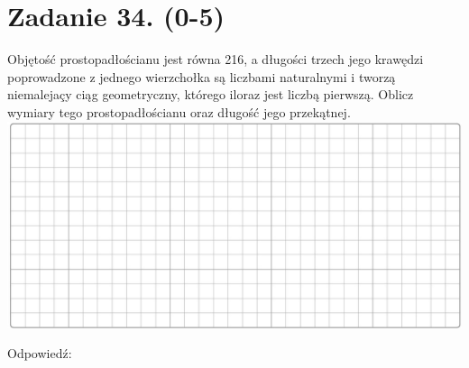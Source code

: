 \documentclass[10pt]{article}
\begin{document}
\section*{Zadanie 34. (0-5)}
Objętość prostopadłościanu jest równa 216, a długości trzech jego krawędzi poprowadzone z jednego wierzchołka są liczbami naturalnymi i tworzą niemalejaçy ciąg geometryczny, którego iloraz jest liczbą pierwszą. Oblicz wymiary tego prostopadłościanu oraz długość jego przekątnej.\\
\includegraphics[max width=\textwidth, center]{2024_11_21_6574e892c2387ce90f12g-14}

Odpowiedź: \(\qquad\)
\end{document}
